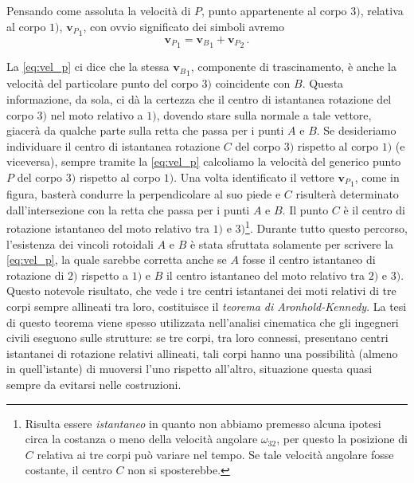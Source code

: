 \noindent Pensando come assoluta la velocit\`a
di $P$, punto  appartenente al corpo  $3)$,
relativa al corpo $1)$, ${{\bm v}_{\scriptscriptstyle P}}_{\scriptscriptstyle 1}$, con ovvio significato dei 
simboli avremo  
\begin{equation}
{{\bm v}_{\scriptscriptstyle P}}_{\scriptscriptstyle 1} = {{\bm v}_{\scriptscriptstyle B}}_{\scriptscriptstyle 1} + {{\bm v}_{\scriptscriptstyle P}}_{\scriptscriptstyle 2}\,.
\label{eq:vel_p}
\end{equation}

\noindent La \ref{eq:vel_p} ci dice che la stessa 
${{\bm v}_B}_1$, componente di trascinamento, \`e anche la velocit\`a del
particolare punto del corpo $3)$ coincidente con $B$.
Questa informazione, da sola, ci d\`a la certezza che il centro di istantanea
rotazione del corpo $3)$ nel moto relativo a $1)$, dovendo stare
sulla normale a tale vettore,
giacer\`a da
qualche parte sulla retta che passa per i punti $A$ e $B$.
Se desideriamo individuare il centro di istantanea rotazione $C$ del
corpo $3)$ rispetto al corpo $1)$ (e viceversa),
sempre tramite la \ref{eq:vel_p} calcoliamo la velocit\`a
del generico punto $P$ del corpo $3)$ rispetto al corpo $1)$.
Una volta identificato il vettore
${{\bm v}_{\scriptscriptstyle P}}_{\scriptscriptstyle 1}$, 
come in figura, baster\`a condurre la perpendicolare al suo piede e
$C$ risulter\`a determinato dall'intersezione con
la retta che passa per i punti $A$ e $B$.
Il punto $C$ \`e il centro di rotazione istantaneo
del moto relativo tra $1)$ e $3)$\footnote{Risulta essere 
{\em istantaneo} in quanto non abbiamo premesso alcuna ipotesi circa la
costanza o meno della velocit\`a angolare 
$\omega_{32}$, per questo la posizione di $C$
relativa ai tre corpi pu\`o variare nel tempo. Se tale velocit\`a angolare fosse costante,
il centro $C$ non si sposterebbe.}.
Durante tutto questo percorso,
l'esistenza dei vincoli rotoidali $A$ e $B$
\`e stata sfruttata solamente per scrivere 
la \ref{eq:vel_p}, la quale sarebbe corretta anche se $A$
fosse il centro istantaneo di rotazione di $2)$ 
rispetto a $1)$ e $B$ il centro istantaneo del moto relativo tra $2)$ e $3)$.
Questo notevole risultato, che vede i tre centri istantanei dei moti relativi di
tre corpi sempre allineati tra loro, costituisce il {\em teorema di
Aronhold-Kennedy}. 
La tesi di questo teorema viene spesso utilizzata nell'analisi cinematica
che gli ingegneri civili eseguono sulle strutture:
se tre corpi, tra loro connessi,
 presentano centri istantanei di rotazione relativi allineati,
tali corpi hanno una possibilit\`a (almeno in quell'istante) di muoversi
l'uno rispetto all'altro, situazione questa quasi sempre da evitarsi
nelle costruzioni.
\newpage
\thispagestyle{empty}
\null

\endinput
